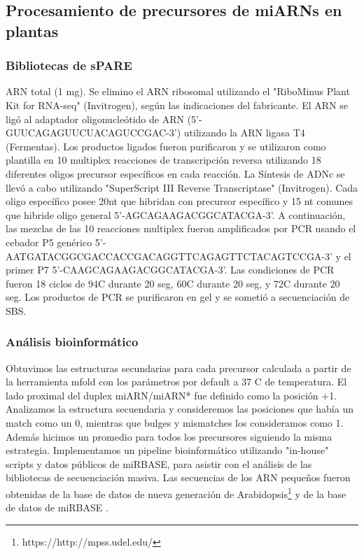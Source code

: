 \subsection{Procesamiento de precursores de miARNs en plantas}

\subsubsection{Bibliotecas de sPARE}
ARN total (1 mg). Se elimino el ARN ribosomal utilizando el "RiboMinus Plant Kit for RNA-seq" (Invitrogen), según las indicaciones del fabricante.
El ARN se ligó al adaptador oligonucleótido de ARN  (5'-GUUCAGAGUUCUACAGUCCGAC-3') utilizando la ARN ligasa T4 (Fermentas).
Los productos ligados fueron purificaron y se utilizaron como plantilla en 10 multiplex reacciones de transcripción reversa utilizando 18 diferentes oligos precursor específicos en cada reacción.
La Síntesis de ADNc se llevó a cabo utilizando "SuperScript III Reverse Transcriptase" (Invitrogen).
Cada oligo específico posee 20nt que hibridan con precursor específico y 15 nt comunes que hibride oligo general 5'-AGCAGAAGACGGCATACGA-3'.
A continuación, las mezclas de las 10 reacciones multiplex fueron amplificados por PCR usando el cebador P5 genérico 5'-AATGATACGGCGACCACCGACAGGTTCAGAGTTCTACAGTCCGA-3' y el primer P7 5'-CAAGCAGAAGACGGCATACGA-3'.
Las condiciones de PCR fueron 18 ciclos de 94\degree C durante 20 seg, 60\degree C durante 20 seg, y 72\degree C durante 20 seg.
Los productos de PCR se purificaron en gel y se sometió a secuenciación de SBS.

\subsubsection{Análisis bioinformático}

Obtuvimos las estructuras secundarias para cada precursor calculada a partir de la herramienta mfold \citep{pmid12824337} con los parámetros por default a 37 \degree C de temperatura.
El lado proximal del duplex miARN/miARN* fue definido como la posición +1.
Analizamos la estructura secuendaria y consideremos las posiciones que había un match como un 0, mientras que bulges y mismatches los consideramos como 1.
Además hicimos un promedio para todos los precursores siguiendo la misma estrategia.
Implementamos un pipeline bioinformático utilizando "in-house" scripts y datos públicos de miRBASE, para asistir con el análisis de las bibliotecas de secuenciación masiva.
Las secuencias de los ARN pequeños fueron obtenidas de la base de datos de nueva generación de Arabidopsis\footnote{https://http://mpss.udel.edu/} \citep{pmid25120269} y  de la base de datos de miRBASE \citep{Kozomara2014}.

